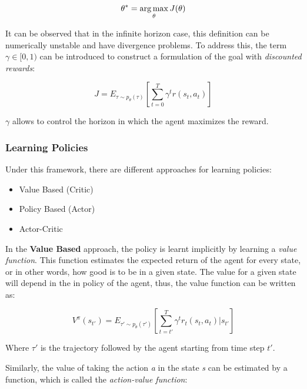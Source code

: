 \begin{equation}
    \theta^{*} = \operatorname*{arg\,max}_{\theta}J(\theta)
\label{eq:objective}
\end{equation}

It can be observed that in the infinite horizon case, this definition can be numerically unstable and have divergence problems. To address this, the term $\gamma \in [0, 1)$ can be introduced to construct a formulation of the goal with \emph{discounted rewards}:

\begin{equation}
    J = E_{\tau \sim p_{\theta}(\tau)} \left[\sum_{t=0}^{T}\gamma^{t}r(s_{t}, a_{t})\right]
\end{equation}

$\gamma$ allows to control the horizon in which the agent maximizes the reward.

\newpage

\subsubsection{Learning Policies}

Under this framework, there are different approaches for learning policies:

\begin{itemize}
    \item Value Based (Critic)
    \item Policy Based (Actor)
    \item Actor-Critic
\end{itemize}

In the \textbf{Value Based} approach, the policy is learnt implicitly by learning a \emph{value function}. This function estimates the expected return of the agent for every state, or in other words, how good is to be in a given state. The value for a given state will depend in the in policy of the agent, thus, the value function can be written as:

\begin{equation}
    V^{\pi}(s_{t'})  = E_{\tau' \sim p_{\theta}(\tau')}\left[\sum_{t=t'}^{T}\gamma^{t}r_{t}(s_{t}, a_{t})|s_{t'}\right]
\end{equation}

Where $\tau'$ is the trajectory followed by the agent starting from time step $t'$.

Similarly, the value of taking the action \emph{a} in the state \emph{s} can be estimated by a function, which is called the \emph{action-value function}:

